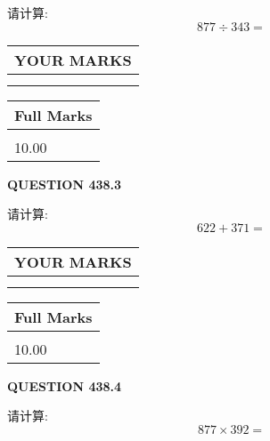 \documentclass{ctexart}
\begin{document}
  
 
请计算:
\begin{equation}
877  \div    %
343 = \nonumber
\end{equation}
 

 

 
  
\vspace{0.2in}
  
\noindent\begin{tabular}{|l|}
\hline
 YOUR MARKS  \\
\hline
 \\ 
 \\ 
\hline
\end{tabular}
\hspace{0.05in} \begin{tabular}{|l|}
\hline
 Full Marks  \\
\hline
 \\ 
10.00 \\
\hline
\end{tabular}
{\textbf{\Large{QUESTION
438.3 
}}}
  
  
 
请计算:
\begin{equation}
622 +  %
371 = \nonumber
\end{equation}
 

 

 
  
\vspace{0.2in}
  
\noindent\begin{tabular}{|l|}
\hline
 YOUR MARKS  \\
\hline
 \\ 
 \\ 
\hline
\end{tabular}
\hspace{0.05in} \begin{tabular}{|l|}
\hline
 Full Marks  \\
\hline
 \\ 
10.00 \\
\hline
\end{tabular}
{\textbf{\Large{QUESTION
438.4 
}}}
  
  
 
请计算:
\begin{equation}
877  \times    %
392 = \nonumber
\end{equation}
 

 

 
  
\end{document}
